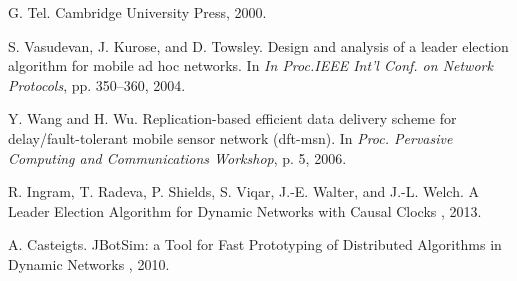 \begin{thebibliography}{1}
	G. Tel.
	\newblock Cambridge University Press, 2000.
	
	S. Vasudevan, J. Kurose, and D. Towsley.
	\newblock Design and analysis of a leader election algorithm for mobile ad hoc networks.
	\newblock In {\em In Proc.IEEE Int’l Conf. on Network Protocols}, pp. 350–360, 2004.
	
	Y. Wang and H. Wu.
	\newblock Replication-based efficient data delivery scheme for delay/fault-tolerant mobile sensor network (dft-msn).
	\newblock In {\em Proc. Pervasive Computing and Communications Workshop}, p. 5, 2006.
	
	R. Ingram, T. Radeva, P. Shields, S. Viqar, J.-E. Walter, and J.-L. Welch.
	\newblock A Leader Election Algorithm for Dynamic Networks with Causal Clocks
	\newblock , 2013.
	
	A. Casteigts.
	\newblock JBotSim: a Tool for Fast Prototyping of Distributed Algorithms in Dynamic Networks
	\newblock , 2010.
	
	
\end{thebibliography}